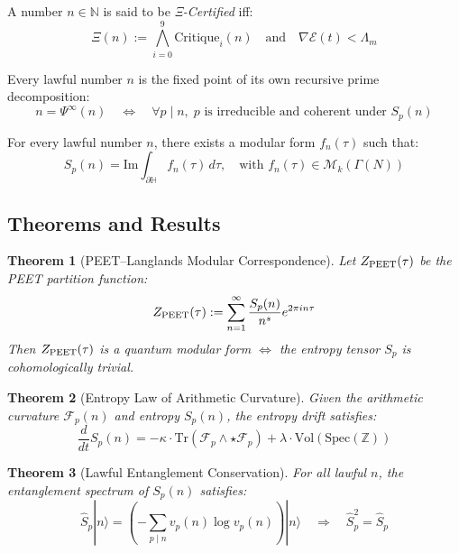 \documentclass[12]{amsart}
\theoremstyle{plain}
\newtheorem{theorem}{Theorem}[section]
\begin{document}
\begin{axiom}
A number $n \in \mathbb{N}$ is said to be \emph{Ξ-Certified} iff:
\[
\Xi(n) := \bigwedge_{i=0}^9 \text{Critique}_i(n) \quad \text{and} \quad \nabla \mathcal{E}(t) < \Lambda_m
\]
\end{axiom}

\begin{axiom}
Every lawful number $n$ is the fixed point of its own recursive prime decomposition:
\[
n = \Psi^\infty(n) \quad \Leftrightarrow \quad \forall p \mid n, \; p \text{ is irreducible and coherent under } S_p(n)
\]
\end{axiom}

\begin{axiom}
For every lawful number $n$, there exists a modular form $f_n(\tau)$ such that:
\[
S_p(n) = \mathrm{Im} \int_{\partial \mathbb{H}} f_n(\tau) \, d\tau, \quad \text{with } f_n(\tau) \in \mathcal{M}_k(\Gamma(N))
\]

\end{axiom}

\subsection{Theorems and Results}

\begin{theorem}[PEET–Langlands Modular Correspondence]
Let $Z_{\textnormal{PEET}}(\tau)$ be the PEET partition function:
\[
Z_{\textnormal{PEET}}(\tau) := \sum_{n=1}^\infty \frac{S_p(n)}{n^s} e^{2\pi i n \tau}
\]
Then $Z_{\textnormal{PEET}}(\tau)$ is a quantum modular form $\Leftrightarrow$ the entropy tensor $S_p$ is cohomologically trivial.
\end{theorem}

\begin{theorem}[Entropy Law of Arithmetic Curvature]
Given the arithmetic curvature $\mathcal{F}_p(n)$ and entropy $S_p(n)$, the entropy drift satisfies:
\[
\frac{d}{dt} S_p(n) = -\kappa \cdot \mathrm{Tr}(\mathcal{F}_p \wedge \star \mathcal{F}_p) + \lambda \cdot \mathrm{Vol}(\mathrm{Spec}(\mathbb{Z}))
\]
\end{theorem}

\begin{theorem}[Lawful Entanglement Conservation]
For all lawful $n$, the entanglement spectrum of $S_p(n)$ satisfies:
\[
\hat{S}_p |n\rangle = \left( - \sum_{p \mid n} v_p(n) \log v_p(n) \right) |n\rangle
\quad \Rightarrow \quad \hat{S}_p^2 = \hat{S}_p
\]
\end{theorem}
\end{document}
